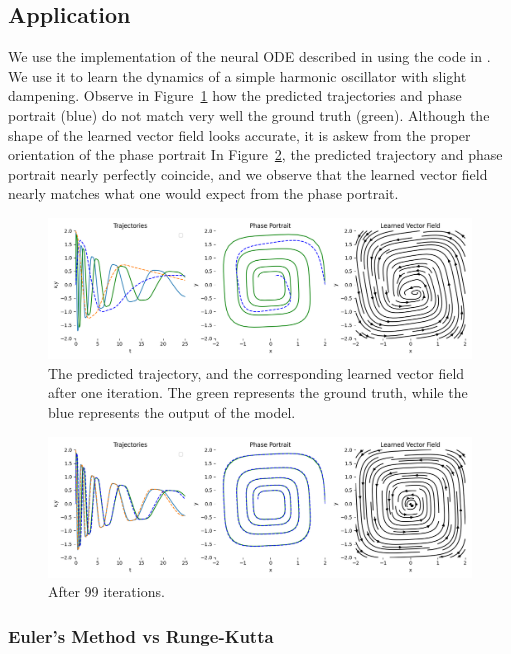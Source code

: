 \documentclass[11pt]{article}
\begin{document}
\subsection{Application}

We use the implementation of the neural ODE described in \cite{chen2018neuralode} using the code in \cite{torchdiffeq}. We use it to learn the dynamics of a simple harmonic oscillator with slight dampening. Observe in Figure~\ref{fig:first_iteration} how the predicted trajectories and phase portrait (blue) do not match very well the ground truth (green). Although the shape of the learned vector field looks accurate, it is askew from the proper orientation of the phase portrait In Figure~\ref{fig:last_iteration}, the predicted trajectory and phase portrait nearly perfectly coincide, and we observe that the learned vector field nearly matches what one would expect from the phase portrait.

\begin{figure}
  \centering
  \includegraphics*[width=\linewidth]{000.png}
  \caption{The predicted trajectory, and the corresponding learned vector field after one iteration. The green represents the ground truth, while the blue represents the output of the model.}
  \label{fig:first_iteration}
\end{figure}

\begin{figure}
  \centering
  \includegraphics*[width=\linewidth]{099.png}
  \caption{After 99 iterations.}
  \label{fig:last_iteration}
\end{figure}

\subsubsection{Euler's Method vs Runge-Kutta}
\end{document}
